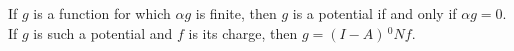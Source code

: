 If $g$ is a function for which $\alpha g$ is finite, then $g$ is a potential if and only if $\alpha g = 0$. If $g$ is such a potential and $f$ is its charge, then $g = (I - A) \,^0N f$.
